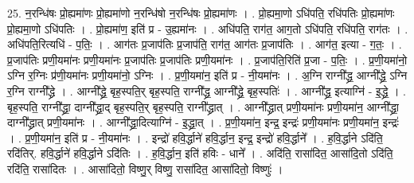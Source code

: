 \documentclass[17pt]{extarticle}
\begin{document}
25. न॒रन्धि॑षः प्रो॒ह्यमा॑णः प्रो॒ह्यमा॑णो न॒रन्धि॑षो न॒रन्धि॑षः प्रो॒ह्यमा॑णः । . प्रो॒ह्यमा॒णो ऽधि॑पति॒ रधि॑पतिः प्रो॒ह्यमा॑णः प्रो॒ह्यमा॒णो ऽधि॑पतिः । . प्रो॒ह्यमा॑ण॒ इति॑ प्र - उ॒ह्यमा॑नः । . अधि॑पति॒ राग॑त॒ आग॒तो ऽधि॑पति॒ रधि॑पति॒ राग॑तः । . अधि॑पति॒रित्यधि॑ - प॒तिः॒ । . आग॑तः प्र॒जाप॑तिः प्र॒जाप॑ति॒ राग॑त॒ आग॑तः प्र॒जाप॑तिः । . आग॑त॒ इत्या - ग॒तः॒ । . प्र॒जाप॑तिः प्रणी॒यमा॑नः प्रणी॒यमा॑नः प्र॒जाप॑तिः प्र॒जाप॑तिः प्रणी॒यमा॑नः । . प्र॒जाप॑ति॒रिति॑ प्र॒जा - प॒तिः॒ । . प्र॒णी॒यमा॑नो॒ ऽग्नि र॒ग्निः प्र॑णी॒यमा॑नः प्रणी॒यमा॑नो॒ ऽग्निः । . प्र॒णी॒यमा॑न॒ इति॑ प्र - नी॒यमा॑नः । . अ॒ग्नि राग्नी᳚द्ध्र॒ आग्नी᳚द्ध्रे॒ ऽग्नि र॒ग्नि राग्नी᳚द्ध्रे । . आग्नी᳚द्ध्रे॒ बृह॒स्पति॒र् बृह॒स्पति॒ राग्नी᳚द्ध्र॒ आग्नी᳚द्ध्रे॒ बृह॒स्पतिः॑ । . आग्नी᳚द्ध्र॒ इत्याग्नि॑ - इ॒द्ध्रे॒ । . बृह॒स्पति॒ राग्नी᳚द्ध्रा॒ दाग्नी᳚द्ध्रा॒द् बृह॒स्पति॒र् बृह॒स्पति॒ राग्नी᳚द्ध्रात् । . आग्नी᳚द्ध्रात् प्रणी॒यमा॑नः प्रणी॒यमा॑न॒ आग्नी᳚द्ध्रा॒ दाग्नी᳚द्ध्रात् प्रणी॒यमा॑नः । . आग्नी᳚द्ध्रा॒दित्याग्नि॑ - इ॒द्ध्रा॒त् । . प्र॒णी॒यमा॑न॒ इन्द्र॒ इन्द्रः॑ प्रणी॒यमा॑नः प्रणी॒यमा॑न॒ इन्द्रः॑ । . प्र॒णी॒यमा॑न॒ इति॑ प्र - नी॒यमा॑नः । . इन्द्रो॑ हवि॒र्द्धाने॑ हवि॒र्द्धान॒ इन्द्र॒ इन्द्रो॑ हवि॒र्द्धाने᳚ । . ह॒वि॒र्द्धाने ऽदि॑ति॒ रदि॑तिर्. हवि॒र्द्धाने॑ हवि॒र्द्धाने ऽदि॑तिः । . ह॒वि॒र्द्धान॒ इति॑ हविः - धाने᳚ । . अदि॑ति॒ रासा॑दित॒ आसा॑दि॒तो ऽदि॑ति॒ रदि॑ति॒ रासा॑दितः । . आसा॑दितो॒ विष्णु॒र् विष्णु॒ रासा॑दित॒ आसा॑दितो॒ विष्णुः॑ । \newline
\end{document}

